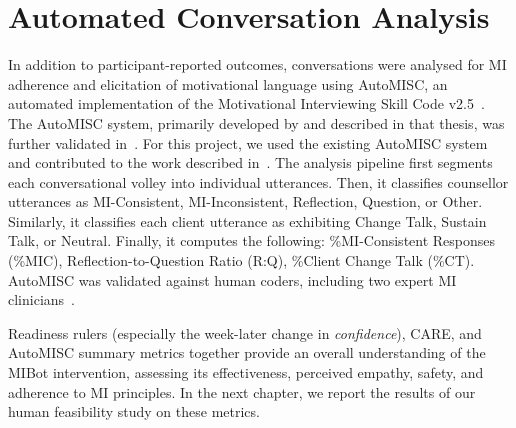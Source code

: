 \section{Automated Conversation Analysis}
\label{subsec:automisc}
In addition to participant-reported outcomes, conversations were analysed for MI adherence and elicitation of motivational language using AutoMISC, an automated implementation of the Motivational Interviewing Skill Code v2.5~\citep{Houck2010}. The AutoMISC system, primarily developed by \citet{ali2025thesis} and described in that thesis, was further validated in~\citep{ali2025automated}. For this project, we used the existing AutoMISC system and contributed to the work described in~\citep{mahmood-etal-2025-fully}. The analysis pipeline first segments each conversational volley into individual utterances. Then, it classifies counsellor utterances as MI-Consistent, MI-Inconsistent, Reflection, Question, or Other. Similarly, it classifies each client utterance as exhibiting Change Talk, Sustain Talk, or Neutral. Finally, it computes the following: \%MI-Consistent Responses (\%MIC), Reflection-to-Question Ratio (R:Q), \%Client Change Talk (\%CT). AutoMISC was validated against human coders, including two expert MI clinicians~\citep{mahmood-etal-2025-fully}.

Readiness rulers (especially the week-later change in \emph{confidence}), CARE, and AutoMISC summary metrics together provide an overall understanding of the MIBot intervention, assessing its effectiveness, perceived empathy, safety, and adherence to MI principles. In the next chapter, we report the results of our human feasibility study on these metrics.
